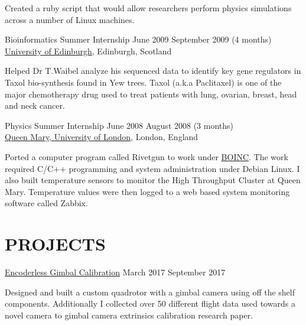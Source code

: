 \documentclass[line,margin]{cv}
\begin{document}
\begin{resume}
\vspace{0.1em}
\begin{adjustwidth}{2.0em}{2.0em}
    Created a ruby script that would allow researchers perform
    physics simulations across a number of Linux machines.
\end{adjustwidth}


\pagebreak
Bioinformatics Summer Internship
\hfill June 2009 \textemdash{} September 2009 (4 months) \\
\href{http://www.ed.ac.uk}{University of Edinburgh}, Edinburgh, Scotland

\vspace{0.1em}
\begin{adjustwidth}{2.0em}{2.0em}
    Helped Dr T.Waibel analyze his sequenced data to identify key gene regulators
    in Taxol bio-synthesis found in Yew trees. Taxol (a.k.a Paclitaxel) is
    one of the major chemotherapy drug used to treat patients with lung,
    ovarian, breast, head and neck cancer.
\end{adjustwidth}


Physics Summer Internship
\hfill June 2008 \textemdash{} August 2008 (3 months) \\
\href{http://www.qmul.ac.uk}{Queen Mary, University of London}, London, England

\vspace{0.1em}
\begin{adjustwidth}{2.0em}{2.0em}
    Ported a computer program called Rivetgun to work under
    \href{https://boinc.berkeley.edu/} {BOINC}\@. The work required C/C++
    programming and system administration under Debian Linux. I also built
    temperature sensors to monitor the High Throughput Cluster at Queen Mary.
    Temperature values were then logged to a web based system monitoring
    software called Zabbix.
\end{adjustwidth}



\section{PROJECTS}

\href{https://youtu.be/v0OLmIKHQlM}
{Encoderless Gimbal Calibration}
\hfill March 2017 \textemdash{} September 2017

\vspace{0.1em}
\begin{adjustwidth}{2.0em}{2.0em}
  Designed and built a custom quadrotor with a gimbal camera using off the
  shelf components.	Additionally I collected over 50 different flight data used
  towards a novel camera to gimbal camera extrinsics calibration research
  paper.
\end{adjustwidth}



\end{resume}
\end{document}
